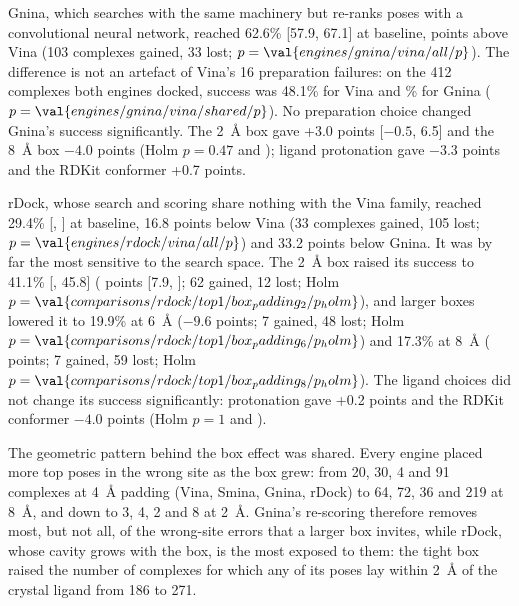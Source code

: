 Gnina, which searches with the same machinery but re-ranks poses with a convolutional
neural network, reached 62.6\% [57.9, 67.1] at baseline,  points above Vina (103
complexes gained, 33 lost; $p = \val{engines/gnina/vina/all/p}$). The difference is not an artefact of
Vina's 16 preparation failures: on the 412 complexes both engines docked, success was
48.1\% for Vina and \% for Gnina ($p = \val{engines/gnina/vina/shared/p}$). No preparation choice
changed Gnina's success significantly. The \SI{2}{\angstrom} box gave +3.0 points [$-0.5$, 6.5] and the
\SI{8}{\angstrom} box $-4.0$ points (Holm $p = 0.47$ and ); ligand protonation gave
$-3.3$ points and the RDKit conformer +0.7 points.

rDock, whose search and scoring share nothing with the Vina family, reached 29.4\% [,
] at baseline, 16.8 points below Vina (33 complexes gained, 105 lost;
$p = \val{engines/rdock/vina/all/p}$) and 33.2 points below Gnina. It was by far the most sensitive to
the search space. The \SI{2}{\angstrom} box raised its success to 41.1\% [, 45.8]
( points [7.9, ]; 62 gained, 12 lost; Holm $p = \val{comparisons/rdock/top1/box_padding_2/p_holm}$), and larger boxes lowered
it to 19.9\% at \SI{6}{\angstrom} ($-9.6$ points; 7 gained, 48 lost; Holm
$p = \val{comparisons/rdock/top1/box_padding_6/p_holm}$) and 17.3\% at \SI{8}{\angstrom} ( points; 7 gained, 59
lost; Holm $p = \val{comparisons/rdock/top1/box_padding_8/p_holm}$). The ligand choices did not change its success
significantly: protonation gave +0.2 points and the RDKit conformer $-4.0$ points (Holm
$p = 1$ and ).

The geometric pattern behind the box effect was shared. Every engine placed more top poses in
the wrong site as the box grew: from 20, 30, 4 and 91 complexes at \SI{4}{\angstrom}
padding (Vina, Smina, Gnina, rDock) to 64, 72, 36 and 219 at \SI{8}{\angstrom}, and down
to 3, 4, 2 and 8 at \SI{2}{\angstrom}. Gnina's re-scoring therefore removes most, but not
all, of the wrong-site errors that a larger box invites, while rDock, whose cavity grows
with the box, is the most exposed to them: the tight box raised the number of complexes for
which any of its poses lay within \SI{2}{\angstrom} of the crystal ligand from 186 to 271.

